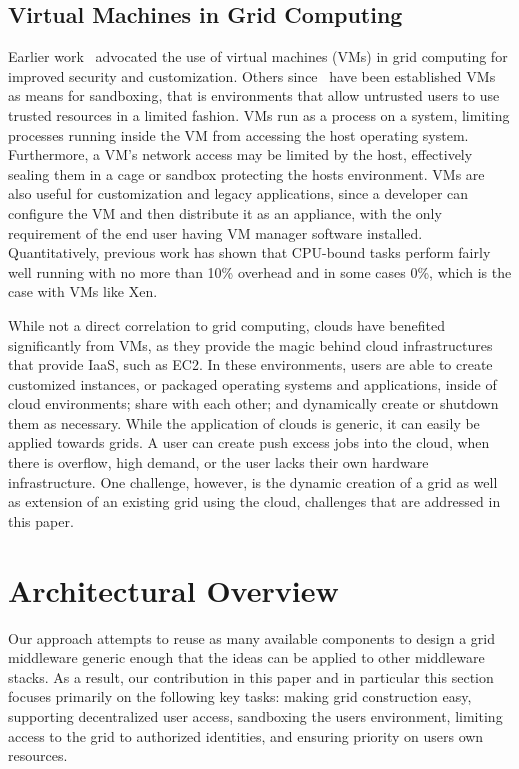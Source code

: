 \documentclass[twocolumn]{svjour3}
\begin{document}
\subsection{Virtual Machines in Grid Computing}

Earlier work~\cite{fig_grid} advocated the use of virtual machines (VMs) in
grid computing for improved security and customization.  Others
since~\cite{sandbox,dve,ourgrid_paper} have been established VMs as means for
sandboxing, that is environments that allow untrusted users to use trusted
resources in a limited fashion.  VMs run as a process on a system, limiting
processes running inside the VM from accessing the host operating system.
Furthermore, a VM's network access may be limited by the host, effectively
sealing them in a cage or sandbox protecting the hosts environment.  VMs are
also useful for customization and legacy applications, since a developer can
configure the VM and then distribute it as an appliance, with the only
requirement of the end user having VM manager software installed.
Quantitatively, previous work has shown that CPU-bound tasks perform fairly
well running with no more than 10\% overhead and in some cases 0\%, which is
the case with VMs like Xen.

While not a direct correlation to grid computing, clouds have benefited
significantly from VMs, as they provide the magic behind cloud infrastructures
that provide IaaS, such as EC2.  In these environments, users are able to
create customized instances, or packaged operating systems and applications,
inside of cloud environments; share with each other; and dynamically create or
shutdown them as necessary.  While the application of clouds is generic, it can
easily be applied towards grids.  A user can create push excess jobs into the
cloud, when there is overflow, high demand, or the user lacks their own
hardware infrastructure.  One challenge, however, is the dynamic creation of a
grid as well as extension of an existing grid using the cloud, challenges that
are addressed in this paper.

\section{Architectural Overview}
\label{architecture}

Our approach attempts to reuse as many available components to design a grid
middleware generic enough that the ideas can be applied to other middleware
stacks.  As a result, our contribution in this paper and in particular this
section focuses primarily on the following key tasks:  making grid construction
easy, supporting decentralized user access, sandboxing the users environment,
limiting access to the grid to authorized identities, and ensuring priority on
users own resources.  
\end{document}
